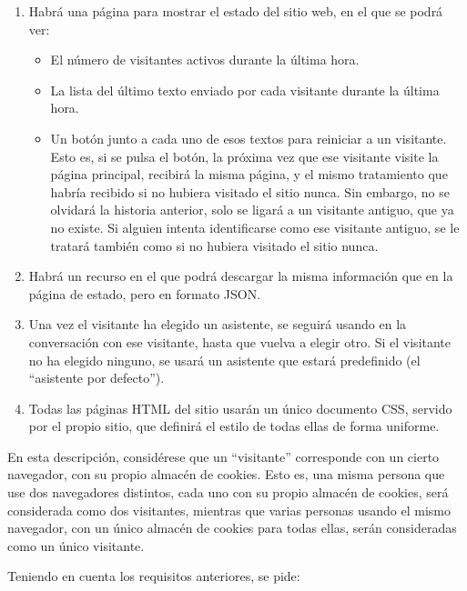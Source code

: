 \begin{enumerate}
\item Habrá una página para mostrar el estado del sitio web, en el que se podrá ver:
  \begin{itemize}
  \item El número de visitantes activos durante la última hora.
  \item La lista del último texto enviado por cada visitante durante la última hora.
  \item Un botón junto a cada uno de esos textos para reiniciar a un visitante. Esto es, si se pulsa el botón, la próxima vez que ese visitante visite la página principal, recibirá la misma página, y el mismo tratamiento que habría recibido si no hubiera visitado el sitio nunca. Sin embargo, no se olvidará la historia anterior, solo se ligará a un visitante antiguo, que ya no existe. Si alguien intenta identificarse como ese visitante antiguo, se le tratará también como si no hubiera visitado el sitio nunca.
  \end{itemize}

\item Habrá un recurso en el que podrá descargar la misma información que en la página de estado, pero en formato JSON.
  
\item Una vez el visitante ha elegido un asistente, se seguirá usando en la conversación con ese visitante, hasta que vuelva a elegir otro. Si el visitante no ha  elegido ninguno, se usará un asistente que estará predefinido (el ``asistente por defecto'').

\item Todas las páginas HTML del sitio usarán un único documento CSS, servido por el propio sitio, que definirá el estilo de todas ellas de forma uniforme.
\end{enumerate}

En esta descripción, considérese que un ``visitante'' corresponde con un cierto navegador, con su propio almacén de cookies. Esto es, una misma persona que use dos navegadores distintos, cada uno con su propio almacén de cookies, será considerada como dos visitantes, mientras que varias personas usando el mismo navegador, con un único almacén de cookies para todas ellas, serán consideradas como un único visitante.


Teniendo en cuenta los requisitos anteriores, se pide:

